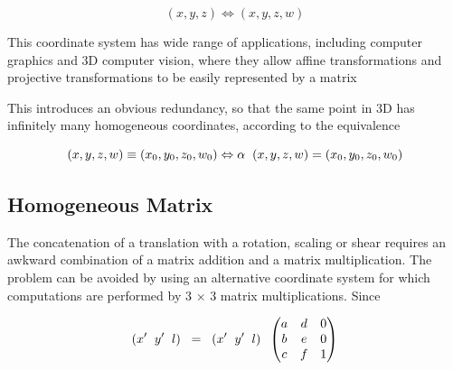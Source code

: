 \documentclass[12pt]{report}
\begin{document}
\begin{center} 
\[ ( x , y , z ) \Leftrightarrow ( x , y , z , w ) \]
\end{center}

\vspace{.3cm}
This coordinate system has wide range of applications, including computer graphics and 3D computer vision, where they allow affine transformations and projective transformations to be easily represented by a matrix
\\
\vspace{.3cm}

This introduces an obvious redundancy, so that the same point in 3D has infinitely many homogeneous coordinates, according to the equivalence
\\
\vspace{.3cm}

\begin{center} 
\[ (x, y, z, w) \equiv (x_{0}, y_{0}, z_{0}, w_{0})   \Leftrightarrow \alpha \hspace{0.2cm} (x, y, z, w) =  (x_{0}, y_{0}, z_{0}, w_{0})  \]
\end{center}


\subsection{Homogeneous Matrix}

\noindent The concatenation of a translation with a rotation, scaling or shear requires an awkward combination of a matrix addition and a matrix multiplication. The problem can be avoided by using an alternative coordinate system for which computations are performed by 3 × 3 matrix multiplications. Since 

\begin{center}
\[ (x' \hspace{.2cm}  y' \hspace{.2cm}  l ) \hspace{.2cm} = \hspace{.2cm} (x' \hspace{.2cm}  y' \hspace{.2cm} l )    \hspace{0.2cm} \begin{pmatrix}
a & d & 0 \\
b & e & 0 \\
c & f & 1 
\end{pmatrix} \]
  
\end{center}
\end{document}

